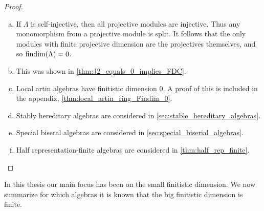 \begin{theorem}
\begin{proof}
\begin{enumerate}[(a)]
			\item If $\Lambda$ is self-injective, then all projective modules are injective. Thus any monomorphism from a projective module is split. It follows that the only modules with finite projective dimension are the projectives themselves, and so $\operatorname{findim}(\Lambda)=0$.
			\item This was shown in \cref{thm:J2_equals_0_implies_FDC}.
			\item Local artin algebras have finitistic dimension 0. A proof of this is included in the appendix, \cref{thm:local_artin_ring_Findim_0}.
			\item Stably hereditary algebras are considered in \cref{sec:stable_hereditary_algebras}.
			\item Special biseral algebras are considered in \cref{sec:special_biserial_algebras}.
			\item Half representation-finite algebras are considered in \cref{thm:half_rep_finite}.
		\end{enumerate}
	\end{proof}
\end{theorem}

In this thesis our main focus has been on the small finitistic dimension. We now summarize for which algebras it is known that the big finitistic dimension is finite.

